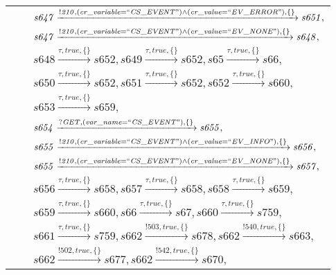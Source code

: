 \begin{tabular}{lcl}
& & $\mathit{s647}\xrightarrow{\mathit{!210}, \mathit{(cr\_variable = ``CS\_EVENT") \land (cr\_value = ``EV\_ERROR")}, \{\}}\mathit{s651},$ \\
& & $\mathit{s647}\xrightarrow{\mathit{!210}, \mathit{(cr\_variable = ``CS\_EVENT") \land (cr\_value = ``EV\_NONE")}, \{\}}\mathit{s648},$ \\
& & $\mathit{s648}\xrightarrow{\mathit{\tau}, \mathit{true}, \{\}}\mathit{s652},\mathit{s649}\xrightarrow{\mathit{\tau}, \mathit{true}, \{\}}\mathit{s652},\mathit{s65}\xrightarrow{\mathit{\tau}, \mathit{true}, \{\}}\mathit{s66},$ \\
& & $\mathit{s650}\xrightarrow{\mathit{\tau}, \mathit{true}, \{\}}\mathit{s652},\mathit{s651}\xrightarrow{\mathit{\tau}, \mathit{true}, \{\}}\mathit{s652},\mathit{s652}\xrightarrow{\mathit{\tau}, \mathit{true}, \{\}}\mathit{s660},$ \\
& & $\mathit{s653}\xrightarrow{\mathit{\tau}, \mathit{true}, \{\}}\mathit{s659},$ \\
& & $\mathit{s654}\xrightarrow{\mathit{?GET}, \mathit{(var\_name = ``CS\_EVENT")}, \{\}}\mathit{s655},$ \\
& & $\mathit{s655}\xrightarrow{\mathit{!210}, \mathit{(cr\_variable = ``CS\_EVENT") \land (cr\_value = ``EV\_INFO")}, \{\}}\mathit{s656},$ \\
& & $\mathit{s655}\xrightarrow{\mathit{!210}, \mathit{(cr\_variable = ``CS\_EVENT") \land (cr\_value = ``EV\_NONE")}, \{\}}\mathit{s657},$ \\
& & $\mathit{s656}\xrightarrow{\mathit{\tau}, \mathit{true}, \{\}}\mathit{s658},\mathit{s657}\xrightarrow{\mathit{\tau}, \mathit{true}, \{\}}\mathit{s658},\mathit{s658}\xrightarrow{\mathit{\tau}, \mathit{true}, \{\}}\mathit{s659},$ \\
& & $\mathit{s659}\xrightarrow{\mathit{\tau}, \mathit{true}, \{\}}\mathit{s660},\mathit{s66}\xrightarrow{\mathit{\tau}, \mathit{true}, \{\}}\mathit{s67},\mathit{s660}\xrightarrow{\mathit{\tau}, \mathit{true}, \{\}}\mathit{s759},$ \\
& & $\mathit{s661}\xrightarrow{\mathit{\tau}, \mathit{true}, \{\}}\mathit{s759},\mathit{s662}\xrightarrow{\mathit{!503}, \mathit{true}, \{\}}\mathit{s678},\mathit{s662}\xrightarrow{\mathit{!540}, \mathit{true}, \{\}}\mathit{s663},$ \\
& & $\mathit{s662}\xrightarrow{\mathit{!502}, \mathit{true}, \{\}}\mathit{s677},\mathit{s662}\xrightarrow{\mathit{!542}, \mathit{true}, \{\}}\mathit{s670},$ \\

\end{tabular}
